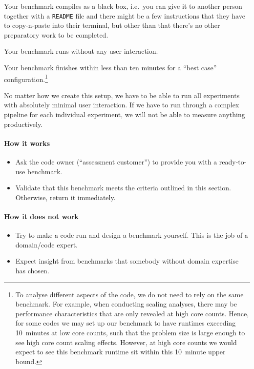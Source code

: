\begin{checklist}
 \item Your benchmark compiles as a black box, i.e.~you can give it to another person together with a \texttt{README} file and there might be a few instructions that they have to copy-n-paste into their terminal, but other than that there's no other preparatory work to be completed.
 \item Your benchmark runs without any user interaction.
 \item Your benchmark finishes within less than ten minutes for a ``best case'' configuration.\footnote{To analyse different aspects of the code, we do not need to rely on the same benchmark. For example, when conducting scaling analyses, there may be performance characteristics that are only revealed at high core counts. Hence, for some codes we may set up our benchmark to have runtimes exceeding 10~minutes at low core counts, such that the problem size is large enough to see high core count scaling effects. However, at high core counts we would expect to see this benchmark runtime sit within this 10~minute upper bound.}
\end{checklist}

No matter how we create this setup, we have to be able to run all experiments with absolutely minimal user interaction. %
If we have to run through a complex pipeline for each individual experiment, we will not be able to measure anything productively.



\paragraph*{How it works}

\begin{itemize}[noitemsep]
  \item[$\boxplus$] Ask the code owner (``assessment customer'') to provide you with a ready-to-use benchmark. 
  \item[$\boxplus$] Validate that this benchmark meets the criteria outlined in this section. Otherwise, return it immediately.
\end{itemize}


\paragraph*{How it does not work}

\begin{itemize}[noitemsep]
  \item[$\boxminus$] Try to make a code run and design a benchmark yourself. This is the job of a domain/code expert.
  \item[$\boxminus$] Expect insight from benchmarks that somebody without domain expertise has chosen.
\end{itemize}


